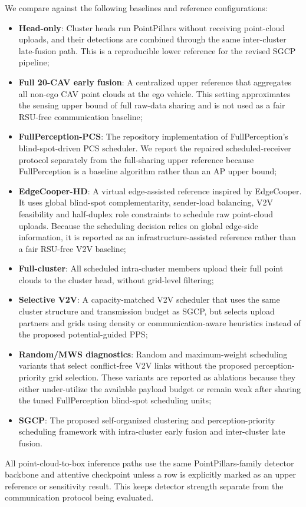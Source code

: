 \documentclass[conference]{IEEEtran}
\begin{document}
We compare against the following baselines and reference configurations:
\begin{itemize}
    \item \textbf{Head-only}: Cluster heads run PointPillars without receiving point-cloud uploads, and their detections are combined through the same inter-cluster late-fusion path. This is a reproducible lower reference for the revised SGCP pipeline;
    \item \textbf{Full 20-CAV early fusion}: A centralized upper reference that aggregates all non-ego CAV point clouds at the ego vehicle. This setting approximates the sensing upper bound of full raw-data sharing and is not used as a fair RSU-free communication baseline;
    \item \textbf{FullPerception-PCS}: The repository implementation of FullPerception's blind-spot-driven PCS scheduler. We report the repaired scheduled-receiver protocol separately from the full-sharing upper reference because FullPerception is a baseline algorithm rather than an AP upper bound;
    \item \textbf{EdgeCooper-HD}: A virtual edge-assisted reference inspired by EdgeCooper. It uses global blind-spot complementarity, sender-load balancing, V2V feasibility and half-duplex role constraints to schedule raw point-cloud uploads. Because the scheduling decision relies on global edge-side information, it is reported as an infrastructure-assisted reference rather than a fair RSU-free V2V baseline;
    \item \textbf{Full-cluster}: All scheduled intra-cluster members upload their full point clouds to the cluster head, without grid-level filtering;
    \item \textbf{Selective V2V}: A capacity-matched V2V scheduler that uses the same cluster structure and transmission budget as SGCP, but selects upload partners and grids using density or communication-aware heuristics instead of the proposed potential-guided PPS;
    \item \textbf{Random/MWS diagnostics}: Random and maximum-weight scheduling variants that select conflict-free V2V links without the proposed perception-priority grid selection. These variants are reported as ablations because they either under-utilize the available payload budget or remain weak after sharing the tuned FullPerception blind-spot scheduling units;
    \item \textbf{SGCP}: The proposed self-organized clustering and perception-priority scheduling framework with intra-cluster early fusion and inter-cluster late fusion.
\end{itemize}
All point-cloud-to-box inference paths use the same PointPillars-family detector backbone and attentive checkpoint unless a row is explicitly marked as an upper reference or sensitivity result. This keeps detector strength separate from the communication protocol being evaluated.
\end{document}
